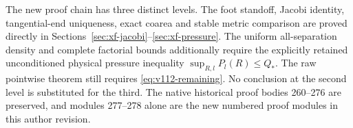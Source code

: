 The new proof chain has three distinct levels. The foot standoff,
Jacobi identity, tangential-end uniqueness, exact coarea and stable
metric comparison are proved directly in
Sections~\ref{sec:xf-jacobi}--\ref{sec:xf-pressure}. The uniform
all-separation density and complete factorial bounds additionally
require the explicitly retained unconditioned physical pressure
inequality $\sup_{R,l}P_l(R)\le Q_*$. The raw pointwise theorem
still requires \eqref{eq:v112-remaining}. No conclusion at the second
level is substituted for the third. The native historical proof bodies
260--276 are preserved, and modules 277--278 alone are the new numbered
proof modules in this author revision.
